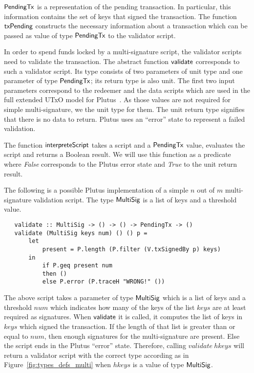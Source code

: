 \documentclass[11pt,a4paper,dvipsnames]{article}
\newcommand{\PendingTx}{\type{PendingTx}}
\theoremstyle{definition}
\begin{document}
$\PendingTx$ is a representation of the pending transaction. In particular, this
information contains the set of keys that signed the transaction. The function
$\mathsf{txPending}$ constructs the necessary information about a transaction
which can be passed as value of type $\PendingTx$ to the validator script.

In order to spend funds locked by a multi-signature script, the validator
scripts need to validate the transaction. The abstract function $\mathsf{validate}$
corresponds to such a validator script. Its type consists of two parameters of
unit type and one parameter of type $\PendingTx$; its return type is also
unit. The first two input parameters correspond to the redeemer and the data
scripts which are used in the full extended UTxO model for
Plutus~\cite{plutus_eutxo}. As those values are not required for simple
multi-signature, we the unit type for them. The unit return type signifies that
there is no data to return. Plutus uses an ``error'' state to represent a failed
validation.

The function $\mathsf{interpreteScript}$ takes a script and a $\PendingTx$ value,
evaluates the script and returns a Boolean result. We will use this function as
a predicate where \emph{False} corresponds to the Plutus error state and
\emph{True} to the unit return result.

The following is a possible Plutus implementation of a simple $n$ out of $m$
multi-signature validation script. The type $\mathsf{MultiSig}$ is a list of keys
and a threshold value.

\begin{verbatim}
   validate :: MultiSig -> () -> () -> PendingTx -> ()
   validate (MultiSig keys num) () () p =
       let
           present = P.length (P.filter (V.txSignedBy p) keys)
       in
           if P.geq present num
           then ()
           else P.error (P.traceH "WRONG!" ())
\end{verbatim}

The above script takes a parameter of type $\mathsf{MultiSig}$ which is a list of
keys and a threshold $num$ which indicates how many of the keys of the list
$keys$ are at least required as signatures. When $\mathsf{validate}$ it is called,
it computes the list of keys in $keys$ which signed the transaction. If the
length of that list is greater than or equal to $num$, then enough signatures
for the multi-signature are present. Else the script ends in the Plutus
``error'' state. Therefore, calling $validate~hkeys$ will return a validator
script with the correct type according as in Figure~\ref{fig:types_defs_multi}
when $hkeys$ is a value of type $\mathsf{MultiSig}$.
\end{document}
